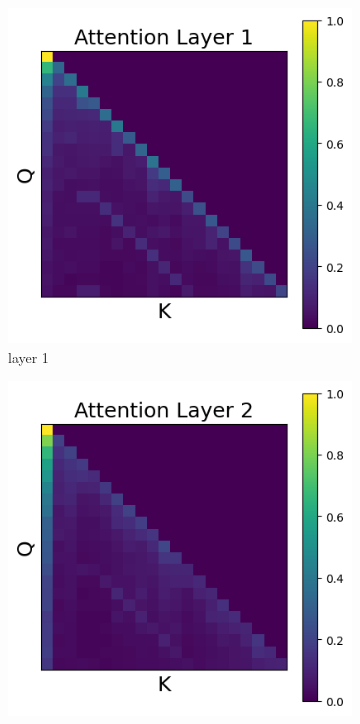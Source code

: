 \documentclass[11pt]{article}
\begin{document}
\subsection{}\label{app:intervention5_2}
\begin{figure}[t]
  \begin{subfigure}[t]{0.24\textwidth}
    \centering
    \includegraphics[width=1.4\columnwidth]{figures/intervention5_2/layer_1.png}
    \caption{layer 1}
  \end{subfigure}\hfill
  \begin{subfigure}[t]{0.24\textwidth}
    \centering
    \includegraphics[width=1.4\columnwidth]{figures/intervention5_2/layer_2.png}

\end{subfigure}
\end{figure}
\end{document}
